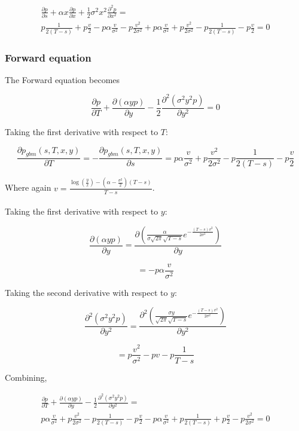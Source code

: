 \documentclass{article}
\theoremstyle{definition}
\begin{document}
\begin{multline*}
\frac{\partial p} {\partial s} +\alpha x \frac{\partial p}{\partial x} + \frac{1}{2} \sigma^2 x^2 \frac{\partial^2 p}{\partial x^2}= \\ p\frac{1}{2(T-s)} + p\frac{v}{2}   - p \alpha \frac{v}{\sigma^2}  -p\frac{v^2}{2\sigma^2}  +  p \alpha \frac{v }{\sigma^2} + p\frac{v^2 }{2\sigma^2 }- p\frac{1}{ 2(T-s)} -p \frac{v }{ 2} =0
\end{multline*}

\subsubsection{Forward equation}
The Forward equation becomes

\[\frac{\partial p} {\partial T}+\frac{\partial \left(\alpha y p\right)}{\partial y}-\frac{1}{2} \frac{\partial^2 \left(\sigma^2 y^2 p\right)}{\partial y^2} =0 \]

Taking the first derivative with respect to \(T\):

\[\frac{\partial p_{gbm}(s, T, x, y)}{\partial T}=  -\frac{\partial p_{gbm}(s, T, x, y)}{\partial s} = p \alpha \frac{v}{\sigma^2} + p\frac{v^2}{2\sigma^2}- p\frac{1}{2(T-s)}- p\frac{v}{2}    \]

Where again \(v=\frac{ \log\left(\frac{y}{x}\right) -\left(\alpha-\frac{\sigma^2}{2}\right)(T-s)}{T-s}\).
\\
\\
Taking the first derivative with respect to \(y\):

\[\frac{\partial \left(\alpha y p\right)}{\partial y}= \frac{\partial \left(\frac{\alpha}{\sigma \sqrt{2\pi} \sqrt{T-s} } e^{-\frac{(T-s)v^2}{2\sigma^2}}\right)}{\partial y} \]

\[=-p\alpha\frac{v }{\sigma^2}\]

Taking the second derivative with respect to \(y\):

\[\frac{\partial^2 \left(\sigma^2 y^2 p\right)}{\partial y^2}=\frac{\partial^2 \left(\frac{\sigma y }{\sqrt{2\pi} \sqrt{T-s} } e^{-\frac{(T-s)v^2}{2\sigma^2}}\right)}{\partial y^2} \]

\[=p\frac{v^2}{\sigma^2} -p v-p \frac{1}{T-s} \]

Combining, 

\begin{multline*} \frac{\partial p} {\partial T}+\frac{\partial \left(\alpha y p\right)}{\partial y}-\frac{1}{2} \frac{\partial^2 \left(\sigma^2 y^2 p\right)}{\partial y^2}= \\p \alpha \frac{v}{\sigma^2} + p\frac{v^2}{2\sigma^2}- p\frac{1}{2(T-s)}- p\frac{v}{2}- p\alpha\frac{v }{\sigma^2} +  p \frac{1}{2(T-s)} +p \frac{v}{2}- p\frac{v^2}{2\sigma^2}=0\end{multline*}
\end{document}
